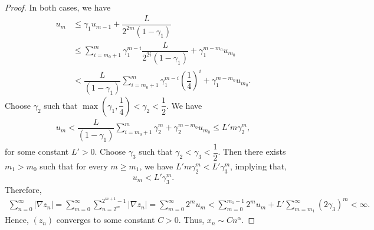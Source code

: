 \begin{proof}
  In both cases, we have
  \begin{align*}
    u_m
     & \le \gamma_1 u_{m-1} + \dfrac{L}{2^{2m}(1-\gamma_1)}                                                             \\
     & \le \sum_{i=m_0+1}^m \gamma_1^{m-i}\dfrac{L}{2^{2i}(1-\gamma_1)} + \gamma_1^{m-m_0}u_{m_0}                       \\
     & < \dfrac{L}{(1-\gamma_1)}\sum_{i=m_0+1}^m \gamma_1^{m-i}\left(\dfrac{1}{4}\right)^{i} + \gamma_1^{m-m_0}u_{m_0}.
  \end{align*}
  Choose $\gamma_2$ such that $\max\left(\gamma_1, \dfrac{1}{4}\right) < \gamma_2 < \dfrac{1}{2}$. We have
  \begin{align*}
    u_m < \dfrac{L}{(1-\gamma_1)}\sum_{i=m_0+1}^m \gamma_2^m + \gamma_2^{m-m_0}u_{m_0} \le L'm\gamma_2^m,
  \end{align*}
  for some constant $L'>0$. Choose $\gamma_3$ such that $\gamma_2 < \gamma_3 < \dfrac{1}{2}$. Then there exists $m_1>m_0$ such that for every $m\ge m_1$, we have $L'm\gamma_2^m < L'\gamma_3^m$, implying that,
  $$u_m < L'\gamma_3^m.$$
  Therefore,
  \begin{align*}
    \sum_{n=0}^\infty|\nabla z_{n}| = \sum_{m=0}^\infty \sum_{n=2^m}^{2^{m+1}-1}|\nabla z_n| = \sum_{m=0}^\infty 2^m u_m < \sum_{m=0}^{m_1-1} 2^m u_m  + L'\sum_{m=m_1}^\infty (2\gamma_3)^{m} < \infty.
  \end{align*}
  Hence, $(z_n)$ converges to some constant $C>0$. Thus, $x_n \sim Cn^\alpha$.
\end{proof}
